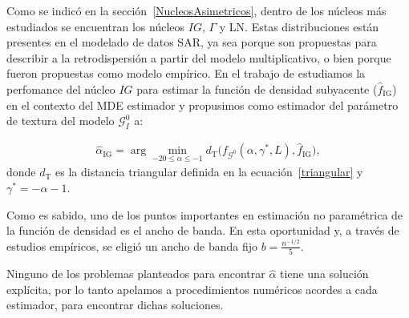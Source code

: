 
Como se indicó en la sección~\ref{NucleosAsimetricos}, dentro de los núcleos más estudiados se encuentran los núcleos $IG$, $\Gamma$ y LN. Estas distribuciones están presentes en el modelado de datos SAR, ya sea porque son propuestas para describir a la retrodispersión a partir del modelo multiplicativo, o bien porque fueron propuestas como modelo empírico. En el trabajo de \citet{gambini2015} estudiamos la perfomance del núcleo $IG$ para estimar la función de densidad subyacente ($\widehat f_\text{IG}$) en el contexto del MDE estimador y propusimos como estimador del parámetro de textura del modelo $\mathcal{G}_I^0$ a:

\begin{align}
\widehat{\alpha}_{\text{IG}}= \arg\min_{-20\leq \alpha \leq -1} d_{\text{T}}\big(f_{\mathcal{G}^{0}}(\alpha,\gamma^*, L ), \widehat f_\text{IG}\big),
\label{minimization}
\end{align}
donde $d_{\text{T}}$ es la distancia triangular definida en la ecuación~\eqref{triangular} y $\gamma^*=-\alpha-1$.  

Como es sabido, uno de los puntos importantes en estimación no paramétrica de la función de densidad es el ancho de banda. En esta oportunidad y, a través de estudios empíricos, se eligió un ancho de banda fijo $b=\frac{n^{-1/2}}{5}$.


Ninguno de los problemas planteados para encontrar $\widehat{\alpha}$ tiene una solución explícita, por lo tanto apelamos a procedimientos numéricos acordes a cada estimador, para encontrar dichas soluciones. 

